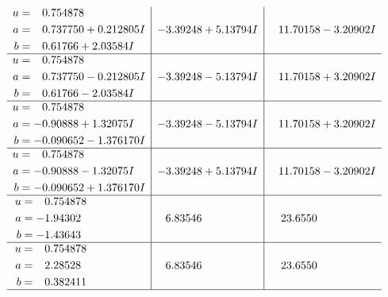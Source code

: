 \documentclass[1p]{elsarticle_modified}
\theoremstyle{definition}
\begin{document}
$$\begin{array}{c|c|c}
\begin{aligned}
u &= \phantom{-}0.754878\phantom{ +0.000000I} \\
a &= \phantom{-}0.737750 + 0.212805 I \\
b &= \phantom{-}0.61766 + 2.03584 I\end{aligned}
 & -3.39248 + 5.13794 I & \phantom{-}11.70158 - 3.20902 I \\ \hline\begin{aligned}
u &= \phantom{-}0.754878\phantom{ +0.000000I} \\
a &= \phantom{-}0.737750 - 0.212805 I \\
b &= \phantom{-}0.61766 - 2.03584 I\end{aligned}
 & -3.39248 - 5.13794 I & \phantom{-}11.70158 + 3.20902 I \\ \hline\begin{aligned}
u &= \phantom{-}0.754878\phantom{ +0.000000I} \\
a &= -0.90888 + 1.32075 I \\
b &= -0.090652 - 1.376170 I\end{aligned}
 & -3.39248 - 5.13794 I & \phantom{-}11.70158 + 3.20902 I \\ \hline\begin{aligned}
u &= \phantom{-}0.754878\phantom{ +0.000000I} \\
a &= -0.90888 - 1.32075 I \\
b &= -0.090652 + 1.376170 I\end{aligned}
 & -3.39248 + 5.13794 I & \phantom{-}11.70158 - 3.20902 I \\ \hline\begin{aligned}
u &= \phantom{-}0.754878\phantom{ +0.000000I} \\
a &= -1.94302\phantom{ +0.000000I} \\
b &= -1.43643\phantom{ +0.000000I}\end{aligned}
 & \phantom{-}6.83546\phantom{ +0.000000I} & \phantom{-}23.6550\phantom{ +0.000000I} \\ \hline\begin{aligned}
u &= \phantom{-}0.754878\phantom{ +0.000000I} \\
a &= \phantom{-}2.28528\phantom{ +0.000000I} \\
b &= \phantom{-}0.382411\phantom{ +0.000000I}\end{aligned}
 & \phantom{-}6.83546\phantom{ +0.000000I} & \phantom{-}23.6550\phantom{ +0.000000I}\\
 \hline 
 \end{array}$$\newpage\newpage\renewcommand{\arraystretch}{1}
\end{document}
